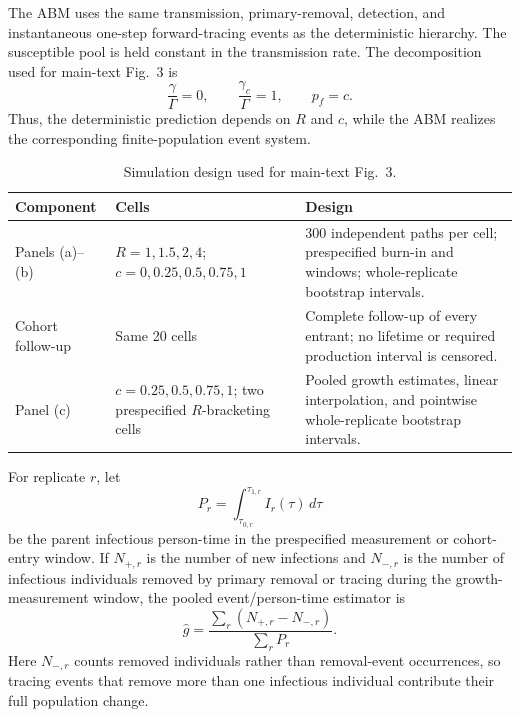 \documentclass[11pt]{article}
\begin{document}
The ABM uses the same transmission, primary-removal, detection, and instantaneous one-step forward-tracing events as the deterministic hierarchy. The susceptible pool is held constant in the transmission rate. The decomposition used for main-text Fig.~3 is
\begin{equation}
\frac{\gamma}{\Gamma}=0,
\qquad
\frac{\gamma_c}{\Gamma}=1,
\qquad
p_f=c.
\label{eq:S8-abm-decomposition}
\end{equation}
Thus, the deterministic prediction depends on $R$ and $c$, while the ABM realizes the corresponding finite-population event system.

\begin{table}[H]
\centering
\caption{Simulation design used for main-text Fig.~3.}
\label{tab:S8-simulation-design}
\scriptsize
\begin{tabular}{p{}p{}p{}}
\toprule
Component & Cells & Design \\
\midrule
Panels (a)--(b) & $R=1,1.5,2,4$; $c=0,0.25,0.5,0.75,1$ & 300 independent paths per cell; prespecified burn-in and windows; whole-replicate bootstrap intervals. \\
Cohort follow-up & Same 20 cells & Complete follow-up of every entrant; no lifetime or required production interval is censored. \\
Panel (c) & $c=0.25,0.5,0.75,1$; two prespecified $R$-bracketing cells & Pooled growth estimates, linear interpolation, and pointwise whole-replicate bootstrap intervals. \\
\bottomrule
\end{tabular}
\end{table}

For replicate $r$, let
\begin{equation}
P_r=\int_{\tau_{0,r}}^{\tau_{1,r}}I_r(\tau)\,d\tau
\label{eq:S8-parent-person-time}
\end{equation}
be the parent infectious person-time in the prespecified measurement or cohort-entry window. If $N_{+,r}$ is the number of new infections and $N_{-,r}$ is the number of infectious individuals removed by primary removal or tracing during the growth-measurement window, the pooled event/person-time estimator is
\begin{equation}
\widehat g
=
\frac{\sum_r(N_{+,r}-N_{-,r})}{\sum_rP_r}.
\label{eq:S8-g-estimator}
\end{equation}
Here $N_{-,r}$ counts removed individuals rather than removal-event occurrences, so tracing events that remove more than one infectious individual contribute their full population change.
\end{document}
